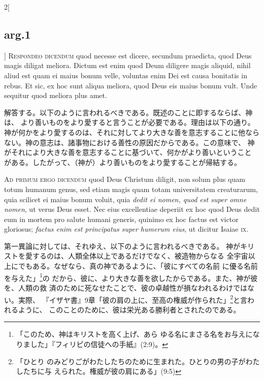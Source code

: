 \documentclass[paper=a4paper,fontsize=10pt,jafontsize=9pt,titlepage]{jlreq}
\begin{document}
\begin{paracol}{2}[\subsection{arg.1}]
{\scshape Respondeo dicendum} quod necesse est dicere, secundum
 praedicta, quod Deus magis diligat meliora. Dictum est enim quod Deum
 diligere magis aliquid, nihil aliud est quam ei maius bonum velle,
 voluntas enim Dei est causa bonitatis in rebus. Et sic, ex hoc sunt
 aliqua meliora, quod Deus eis maius bonum vult. Unde sequitur quod
 meliora plus amet.

\switchcolumn

解答する。以下のように言われるべきである。既述のことに即するならば、神は、
 より善いものをより愛すると言うことが必要である。理由は以下の通り。
神が何かをより愛するのは、それに対してより大きな善を意志することに他なら
 ない。神の意志は、諸事物における善性の原因だからである。この意味で、
神がそれにより大きな善を意志することに基づいて、何かがより善いということ
 がある。したがって、（神が）より善いものをより愛することが帰結する。

\switchcolumn*[\subsection{ad.1}]


{\scshape Ad primum ergo dicendum} quod Deus Christum diligit, non solum
 plus quam totum humanum genus, sed etiam magis quam totam universitatem
 creaturarum, quia scilicet ei maius bonum voluit, quia {\itshape dedit ei nomen,
 quod est super omne nomen}, ut verus Deus esset. Nec eius excellentiae
 deperiit ex hoc quod Deus dedit eum in mortem pro salute humani
 generis, quinimo ex hoc factus est victor gloriosus; {\itshape factus enim est
 principatus super humerum eius}, ut dicitur Isaiae {\scshape ix}.

\switchcolumn

第一異論に対しては、それゆえ、以下のように言われるべきである。
 神がキリストを愛するのは、人類全体以上であるだけでなく、被造物からなる
 全宇宙以上にでもある。なぜなら、真の神であるように、「彼にすべての名前
 に優る名前を与えた」\footnote{「このため、神はキリストを高く上げ、あら
 ゆる名にまさる名をお与えになりました」『フィリピの信徒への手紙』(2:9)。}の
 だから、彼に、より大きな善を欲したからである。また、神が彼を、人類の救
 済のために死なせたことで、彼の卓越性が損なわれるわけではない。実際、
 『イザヤ書』9章「彼の肩の上に、至高の権威が作られた」\footnote{「ひとり
 のみどりごがわたしたちのために生まれた。ひとりの男の子がわたしたちに与
 えられた。権威が彼の肩にある」(9:5)}と言われるように、
 このことのために、彼は栄光ある勝利者とされたのである。

\switchcolumn*[\subsection{ad.2}]



\end{paracol}
\end{document}
